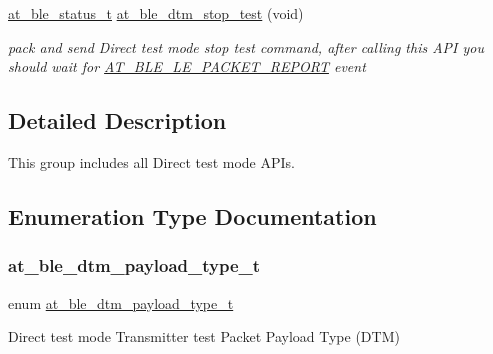 \begin{DoxyCompactItemize}
\mbox{\hyperlink{group__error__codes__group_ga3b1db9b95feb157b3c188ca27fe76988}{at\+\_\+ble\+\_\+status\+\_\+t}} \mbox{\hyperlink{group__dtm__group_gafa12d16c45ae0e5efc01beba4772ab69}{at\+\_\+ble\+\_\+dtm\+\_\+stop\+\_\+test}} (void)
\begin{DoxyCompactList}\small\item\em pack and send Direct test mode stop test command, after calling this A\+PI you should wait for \mbox{\hyperlink{at__ble__api_8h_a3324640b95f33169515f89738ed5baebad529dc56000832da6054a10c8689d099}{A\+T\+\_\+\+B\+L\+E\+\_\+\+L\+E\+\_\+\+P\+A\+C\+K\+E\+T\+\_\+\+R\+E\+P\+O\+RT}} event \end{DoxyCompactList}\end{DoxyCompactItemize}


\subsection{Detailed Description}
This group includes all Direct test mode A\+P\+Is. 



\subsection{Enumeration Type Documentation}
\mbox{\label{group__dtm__group_ga08e5052da6ec260eb2778714b5ffdce8}} 
\subsubsection{\texorpdfstring{at\_ble\_dtm\_payload\_type\_t}{at\_ble\_dtm\_payload\_type\_t}}
{\footnotesize\ttfamily enum \mbox{\hyperlink{group__dtm__group_ga08e5052da6ec260eb2778714b5ffdce8}{at\+\_\+ble\+\_\+dtm\+\_\+payload\+\_\+type\+\_\+t}}}



Direct test mode Transmitter test Packet Payload Type (D\+TM) 

